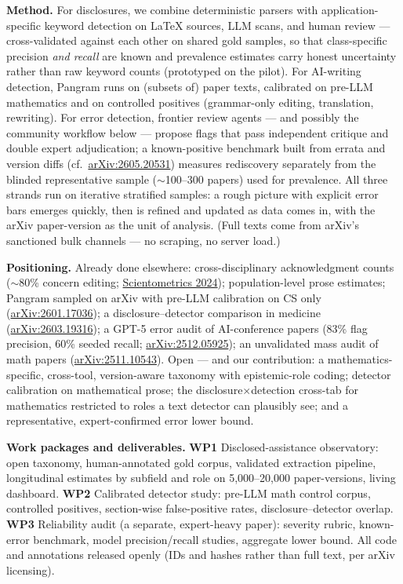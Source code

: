 \documentclass[10pt]{article}
\newcommand{\ax}[1]{\href{https://arxiv.org/abs/#1}{\mbox{arXiv:#1}}}
\newcommand{\head}[1]{\vspace{2pt}\textbf{#1}\enspace}
\begin{document}
\head{Method.}
For disclosures, we combine deterministic parsers with application-specific keyword detection on \LaTeX{} sources, LLM scans, and human review --- cross-validated against each other on shared gold samples, so that class-specific precision \emph{and recall} are known and prevalence estimates carry honest uncertainty rather than raw keyword counts (prototyped on the pilot). For AI-writing detection, Pangram runs on (subsets of) paper texts, calibrated on pre-LLM mathematics and on controlled positives (grammar-only editing, translation, rewriting). For error detection, frontier review agents --- and possibly the community workflow below --- propose flags that pass independent critique and double expert adjudication; a known-positive benchmark built from errata and version diffs (cf.\ \ax{2605.20531}) measures rediscovery separately from the blinded representative sample ($\sim$100--300 papers) used for prevalence. All three strands run on iterative stratified samples: a rough picture with explicit error bars emerges quickly, then is refined and updated as data comes in, with the arXiv paper-version as the unit of analysis. (Full texts come from arXiv's sanctioned bulk channels --- no scraping, no server load.)

\head{Positioning.}
Already done elsewhere: cross-disciplinary acknowledgment counts ($\sim$80\% concern editing; \href{https://link.springer.com/article/10.1007/s11192-024-05193-y}{Scientometrics 2024}); population-level prose estimates; Pangram sampled on arXiv with pre-LLM calibration on CS only (\ax{2601.17036}); a disclosure--detector comparison in medicine (\ax{2603.19316}); a GPT-5 error audit of AI-conference papers (83\% flag precision, 60\% seeded recall; \ax{2512.05925}); an unvalidated mass audit of math papers (\ax{2511.10543}). Open --- and our contribution: a mathematics-specific, cross-tool, version-aware taxonomy with epistemic-role coding; detector calibration on mathematical prose; the disclosure$\times$detection cross-tab for mathematics restricted to roles a text detector can plausibly see; and a representative, expert-confirmed error lower bound.

\head{Work packages and deliverables.}
\textbf{WP1} Disclosed-assistance observatory: open taxonomy, human-annotated gold corpus, validated extraction pipeline, longitudinal estimates by subfield and role on 5{,}000--20{,}000 paper-versions, living dashboard. \textbf{WP2} Calibrated detector study: pre-LLM math control corpus, controlled positives, section-wise false-positive rates, disclosure--detector overlap. \textbf{WP3} Reliability audit (a separate, expert-heavy paper): severity rubric, known-error benchmark, model precision/recall studies, aggregate lower bound. All code and annotations released openly (IDs and hashes rather than full text, per arXiv licensing).
\end{document}
